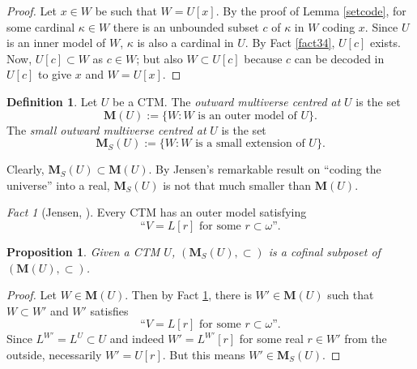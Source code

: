 \documentclass[12pt, twoside]{memoir}
\numberwithin{equation}{section}
\newtheorem{prop}[thm]{Proposition}
\theoremstyle{definition}
\newtheorem{defi}[thm]{Definition}
\theoremstyle{remark}
\newtheorem{fact}[thm]{Fact}
\theoremstyle{definition}
\theoremstyle{definition}
\theoremstyle{definition}
\theoremstyle{remark}
\begin{document}
\begin{proof}
Let $x \in W$ be such that $W = U[x]$. By the proof of Lemma \ref{setcode}, for some cardinal $\kappa \in W$ there is an unbounded subset $c$ of $\kappa$ in $W$ coding $x$. Since $U$ is an inner model of $W$, $\kappa$ is also a cardinal in $U$. By Fact \ref{fact34}, $U[c]$ exists. Now, $U[c] \subset W$ as $c \in W$; but also $W \subset U[c]$ because $c$ can be decoded in $U[c]$ to give $x$ and $W = U[x]$.
\end{proof}

\begin{defi}
Let $U$ be a CTM. The \emph{outward multiverse centred at} $U$ is the set
\begin{equation*}
    \mathbf{M}(U) := \{W : W \text{ is an outer model of } U\} \text{.}
\end{equation*}
The \emph{small outward multiverse centred at} $U$ is the set
\begin{equation*}
    \mathbf{M}_{S}(U) := \{W : W \text{ is a small extension of } U\} \text{.}
\end{equation*}
\end{defi}

Clearly, $\mathbf{M}_{S}(U) \subset \mathbf{M}(U)$. By Jensen's remarkable result on ``coding the universe'' into a real, $\mathbf{M}_{S}(U)$ is not that much smaller than $\mathbf{M}(U)$.

\begin{fact}[Jensen, \cite{jensencoding}]\label{fact37}
Every CTM has an outer model satisfying 
\begin{equation*}
    \text{``} V = L[r] \text{ for some } r \subset \omega \text{''.}
\end{equation*}
\end{fact}

\begin{prop}
Given a CTM $U$, $(\mathbf{M}_{S}(U), \subset)$ is a cofinal subposet of $(\mathbf{M}(U), \subset)$.
\end{prop}

\begin{proof}
Let $W \in \mathbf{M}(U)$. Then by Fact \ref{fact37}, there is $W' \in \mathbf{M}(U)$ such that $W \subset W'$ and $W'$ satisfies
\begin{equation*}
    \text{``} V = L[r] \text{ for some } r \subset \omega \text{''.}
\end{equation*}
Since $L^{W'} = L^U \subset U$ and indeed $W' = L^{W'}[r]$ for some real $r \in W'$ from the outside, necessarily $W' = U[r]$. But this means $W' \in \mathbf{M}_{S}(U)$.
\end{proof}
\end{document}
